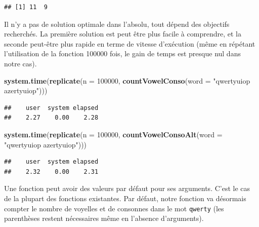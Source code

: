 \documentclass[
]{book}
\newenvironment{Shaded}{\begin{snugshade}}{\end{snugshade}}
\newcommand{\DataTypeTok}[1]{\textcolor[rgb]{0.13,0.29,0.53}{#1}}
\newcommand{\DecValTok}[1]{\textcolor[rgb]{0.00,0.00,0.81}{#1}}
\newcommand{\KeywordTok}[1]{\textcolor[rgb]{0.13,0.29,0.53}{\textbf{#1}}}
\newcommand{\NormalTok}[1]{#1}
\newcommand{\StringTok}[1]{\textcolor[rgb]{0.31,0.60,0.02}{#1}}
\begin{document}
\begin{verbatim}
## [1] 11  9
\end{verbatim}

Il n'y a pas de solution optimale dans l'absolu, tout dépend des objectifs recherchés. La première solution est peut être plus facile à comprendre, et la seconde peut-être plus rapide en terme de vitesse d'exécution (même en répétant l'utilisation de la fonction 100000 fois, le gain de temps est presque nul dans notre cas).

\begin{Shaded}
\begin{Highlighting}[]
\KeywordTok{system.time}\NormalTok{(}\KeywordTok{replicate}\NormalTok{(}\DataTypeTok{n =} \DecValTok{100000}\NormalTok{, }\KeywordTok{countVowelConso}\NormalTok{(}\DataTypeTok{word =} \StringTok{"qwertyuiop azertyuiop"}\NormalTok{)))}
\end{Highlighting}
\end{Shaded}

\begin{verbatim}
##    user  system elapsed 
##    2.27    0.00    2.28
\end{verbatim}

\begin{Shaded}
\begin{Highlighting}[]
\KeywordTok{system.time}\NormalTok{(}\KeywordTok{replicate}\NormalTok{(}\DataTypeTok{n =} \DecValTok{100000}\NormalTok{, }\KeywordTok{countVowelConsoAlt}\NormalTok{(}\DataTypeTok{word =} \StringTok{"qwertyuiop azertyuiop"}\NormalTok{)))}
\end{Highlighting}
\end{Shaded}

\begin{verbatim}
##    user  system elapsed 
##    2.32    0.00    2.31
\end{verbatim}

Une fonction peut avoir des valeurs par défaut pour ses arguments. C'est le cas de la plupart des fonctions existantes. Par défaut, notre fonction va désormais compter le nombre de voyelles et de consonnes dans le mot \texttt{qwerty} (les parenthèses restent nécessaires même en l'absence d'arguments).
\end{document}
